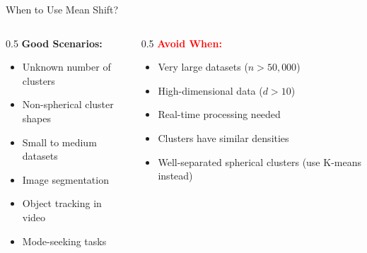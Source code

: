 \begin{frame}{When to Use Mean Shift?}
    \begin{columns}[T]
        \begin{column}{0.5\textwidth}
            \textbf{\textcolor{green!60!black}{Good Scenarios:}}
            \begin{itemize}
                \item Unknown number of clusters
                \item Non-spherical cluster shapes
                \item Small to medium datasets
                \item Image segmentation
                \item Object tracking in video
                \item Mode-seeking tasks
            \end{itemize}
        \end{column}

        \begin{column}{0.5\textwidth}
            \textbf{\textcolor{red}{Avoid When:}}
            \begin{itemize}
                \item Very large datasets ($n > 50{,}000$)
                \item High-dimensional data ($d > 10$)
                \item Real-time processing needed
                \item Clusters have similar densities
                \item Well-separated spherical clusters (use K-means instead)
            \end{itemize}
        \end{column}
    \end{columns}
\end{frame}
